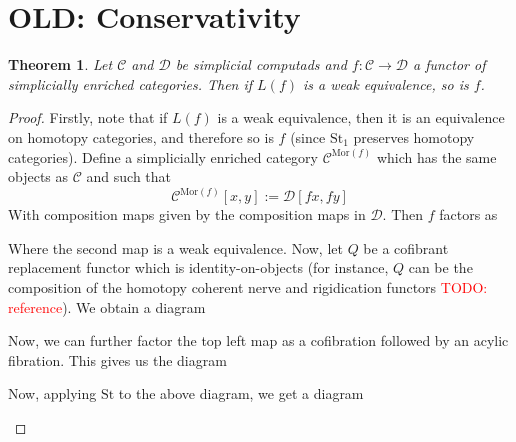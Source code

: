 \documentclass[12pt]{article}
\newtheorem{theorem}{Theorem}[section]
\theoremstyle{definition}
\newcommand{\TODO}[1]{\textcolor{red}{TODO: {#1}}}
\newcommand{\C}{\mathcal{C}}
\newcommand{\D}{\mathcal{D}}
\newcommand{\st}{\text{St}}
\begin{document}
\section{OLD: Conservativity}
	\begin{theorem}
		Let $\C$ and $\D$ be simplicial computads and $f: \C \to \D$ a functor of simplicially enriched categories. Then if $L(f)$ is a weak equivalence, so is $f$. 
	\end{theorem}
	\begin{proof}
		Firstly, note that if $L(f)$ is a weak equivalence, then it is an equivalence on homotopy categories, and therefore so is $f$ (since $\text{St}_1$ preserves homotopy categories). 
		Define a simplicially enriched category $\C^{\text{Mor}(f)}$ which has the same objects as $\C$ and such that 
		$$\C^{\text{Mor}(f)}[x,y] := \D[fx,fy]$$
		With composition maps given by the composition maps in $\D$. Then $f$ factors as 
		\begin{center}
		\end{center}
		Where the second map is a weak equivalence. Now, let $Q$ be a cofibrant replacement functor which is identity-on-objects (for instance, $Q$ can be the composition of the homotopy coherent nerve and rigidication functors \TODO{reference}). We obtain a diagram
		\begin{center}
		\end{center}
		Now, we can further factor the top left map as a cofibration followed by an acylic fibration. This gives us the diagram
		\begin{center}
		\end{center}
		Now, applying $\st$ to the above diagram, we get a diagram
		\begin{center}

\end{center}
\end{proof}
\end{document}
